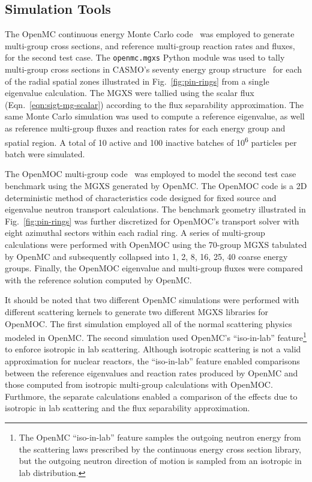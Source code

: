 \subsection{Simulation Tools}
\label{subsubsec:sim-tools-case2}

The OpenMC continuous energy Monte Carlo code~\citep{romano2013openmc} was employed to generate multi-group cross sections, and reference multi-group reaction rates and fluxes, for the second test case. The \texttt{openmc.mgxs} Python module was used to tally multi-group cross sections in CASMO's seventy energy group structure~\citep{rhodes2006casmo} for each of the radial spatial zones illustrated in Fig.~\ref{fig:pin-rings} from a single eigenvalue calculation. The MGXS were tallied using the scalar flux (Eqn.~\ref{eqn:sigt-mg-scalar}) according to the flux separability approximation. The same Monte Carlo simulation was used to compute a reference eigenvalue, as well as reference multi-group fluxes and reaction rates for each energy group and spatial region. A total of 10 active and 100 inactive batches of 10\textsuperscript{6} particles per batch were simulated. 

The OpenMOC multi-group code~\citep{boyd2014openmoc} was employed to model the second test case benchmark using the MGXS generated by OpenMC. The OpenMOC code is a 2D deterministic method of characteristics code designed for fixed source and eigenvalue neutron transport calculations. The benchmark geometry illustrated in Fig.~\ref{fig:pin-rings} was further discretized for OpenMOC's transport solver with eight azimuthal sectors within each radial ring. A series of multi-group calculations were performed with OpenMOC using the 70-group MGXS tabulated by OpenMC and subsequently collapsed into 1, 2, 8, 16, 25, 40 coarse energy groups. Finally, the OpenMOC eigenvalue and multi-group fluxes were compared with the reference solution computed by OpenMC.

It should be noted that two different OpenMC simulations were performed with different scattering kernels to generate two different MGXS libraries for OpenMOC. The first simulation employed all of the normal scattering physics modeled in OpenMC. The second simulation used OpenMC's ``iso-in-lab'' feature\footnote{The OpenMC ``iso-in-lab'' feature samples the outgoing neutron energy from the scattering laws prescribed by the continuous energy cross section library, but the outgoing neutron direction of motion is sampled from an isotropic in lab distribution.} to enforce isotropic in lab scattering. Although isotropic scattering is not a valid approximation for nuclear reactors, the ``iso-in-lab'' feature enabled comparisons between the reference eigenvalues and reaction rates produced by OpenMC and those computed from isotropic multi-group calculations with OpenMOC. Furthmore, the separate calculations enabled a comparison of the effects due to isotropic in lab scattering and the flux separability approximation.